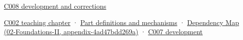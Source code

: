 \hyperref[appendix-fd090d982a15-m008---parts-113-126]{C008 development and corrections}

\href{Continuous\%20Notes/Computing\%20Foundations\%20-\%20From\%20Bits\%20to\%20C++\%20and\%20Systems\%20APIs\#Arithmetic\%20becomes\%20a\%20policy}{C002 teaching chapter} · \hyperref[appendix-fd090d982a15]{Part definitions and mechanisms} · \href{../02-Foundations-II/main.pdf\#nameddest=appendix-4ad47bdd269a}{Dependency Map (02-Foundations-II, appendix-4ad47bdd269a)} · \href{Continuous\%20Notes/Computing\%20Foundations\%20-\%20From\%20Bits\%20to\%20C++\%20and\%20Systems\%20APIs\#Choose\%20a\%20type\%20for\%20its\%20promise,\%20not\%20its\%20familiar\%20size}{C007 development}
